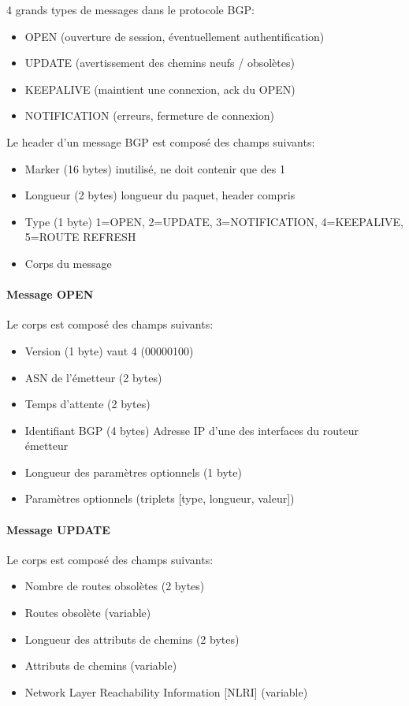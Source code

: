 \documentclass{report}
\begin{document}
4 grands types de messages dans le protocole BGP:

\begin{itemize}
\item OPEN (ouverture de session, éventuellement authentification)
\item UPDATE (avertissement des chemins neufs / obsolètes)
\item KEEPALIVE (maintient une connexion, ack du OPEN)
\item NOTIFICATION (erreurs, fermeture de connexion)
\end{itemize}

Le header d'un message BGP est composé des champs suivants:

\begin{itemize}
\item Marker (16 bytes) inutilisé, ne doit contenir que des 1
\item Longueur (2 bytes) longueur du paquet, header compris
\item Type (1 byte) 1=OPEN, 2=UPDATE, 3=NOTIFICATION, 4=KEEPALIVE,
  5=ROUTE REFRESH
\item Corps du message
\end{itemize}

\paragraph{Message OPEN}

Le corps est composé des champs suivants:

\begin{itemize}
\item Version (1 byte) vaut 4 (00000100)
\item ASN de l'émetteur (2 bytes)
\item Temps d'attente (2 bytes)
\item Identifiant BGP (4 bytes) Adresse IP d'une des interfaces du
  routeur émetteur
\item Longueur des paramètres optionnels (1 byte)
\item Paramètres optionnels (triplets [type, longueur, valeur])
\end{itemize}

\paragraph{Message UPDATE}

Le corps est composé des champs suivants:

\begin{itemize}
\item Nombre de routes obsolètes (2 bytes)
\item Routes obsolète (variable)
\item Longueur des attributs de chemins (2 bytes)
\item Attributs de chemins (variable)
\item Network Layer Reachability Information [NLRI] (variable)
\end{itemize}
\end{document}
